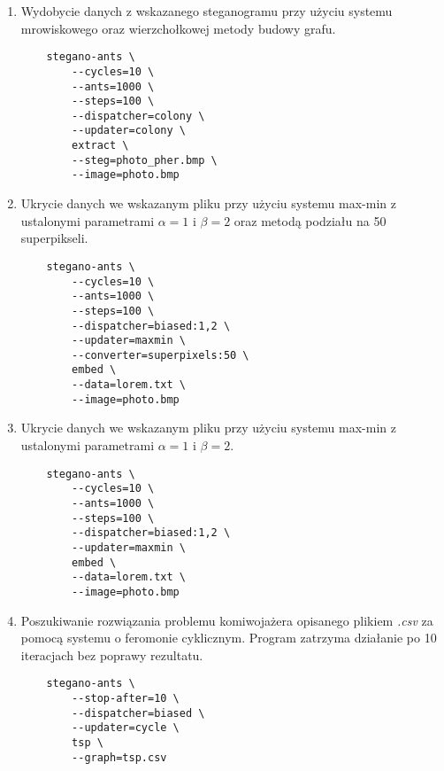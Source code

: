 {{{\begin{enumerate}
                \item Wydobycie danych z wskazanego steganogramu przy użyciu systemu mrowiskowego oraz wierzchołkowej
                metody budowy grafu.

                \begin{lstlisting}
    stegano-ants \
        --cycles=10 \
        --ants=1000 \
        --steps=100 \
        --dispatcher=colony \
        --updater=colony \
        extract \
        --steg=photo_pher.bmp \
        --image=photo.bmp
                \end{lstlisting}

                \item Ukrycie danych we wskazanym pliku przy użyciu systemu max-min z ustalonymi parametrami $\alpha=1$
                i $\beta=2$ oraz metodą podziału na 50 superpikseli.

                \begin{lstlisting}
    stegano-ants \
        --cycles=10 \
        --ants=1000 \
        --steps=100 \
        --dispatcher=biased:1,2 \
        --updater=maxmin \
        --converter=superpixels:50 \
        embed \
        --data=lorem.txt \
        --image=photo.bmp
                \end{lstlisting}

                \item Ukrycie danych we wskazanym pliku przy użyciu systemu max-min z ustalonymi parametrami $\alpha=1$
                i $\beta=2$.

                \begin{lstlisting}
    stegano-ants \
        --cycles=10 \
        --ants=1000 \
        --steps=100 \
        --dispatcher=biased:1,2 \
        --updater=maxmin \
        embed \
        --data=lorem.txt \
        --image=photo.bmp
                \end{lstlisting}

                \item Poszukiwanie rozwiązania problemu komiwojażera opisanego plikiem \textit{.csv} za pomocą systemu o
                feromonie cyklicznym. Program zatrzyma działanie po 10 iteracjach bez poprawy rezultatu.

                \begin{lstlisting}
    stegano-ants \
        --stop-after=10 \
        --dispatcher=biased \
        --updater=cycle \
        tsp \
        --graph=tsp.csv
                \end{lstlisting}
            \end{enumerate}
        }
    }

}
